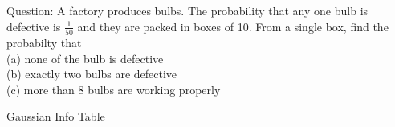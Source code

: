\documentclass[journal,12pt,onecolumn]{IEEEtran}
\theoremstyle{remark}
\begin{document}
%
Question: A factory produces bulbs. The probability that any one bulb is defective is $\frac{1}{50}$ and they are packed in boxes of 10. From a single box, find the probabilty that\\
(a) none of the bulb is defective\\
(b) exactly two bulbs are defective\\
(c) more than 8 bulbs are working properly
\\ \solution
\fi
\begin{table}[!htb]
	
	\caption{Gaussian Info Table}
	\label{table:gaussian/9/3/25/}	
\end{table}
%
\end{document}
